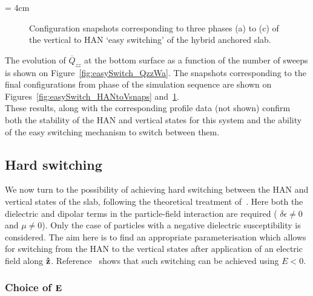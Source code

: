 \picW = 4cm
\begin{figure}
	\centering
	\caption{Configuration snapshots corresponding to three phases (a) to (c) 
	of the vertical to HAN `easy switching' of the hybrid anchored slab.}
	\label{fig:easySwitch_VtoHANsnaps}
\end{figure}

The evolution of $\overline{Q}_{zz}$ at the bottom surface as a function of the number of sweeps is
shown on Figure~\ref{fig:easySwitch_QzzWa}. The snapshots corresponding to the final
configurations from phase of the simulation sequence are shown on 
Figures~\ref{fig:easySwitch_HANtoVsnaps} and~\ref{fig:easySwitch_VtoHANsnaps}.\\
These results, along with the corresponding profile data (not shown) confirm both the stability
of the HAN and vertical states for this system and the ability of the easy switching mechanism
to switch between them.


\subsection{Hard switching}
\label{ss:hardSwitch}

We now turn to the possibility of achieving hard switching between the HAN and vertical states of 
the slab, following the theoretical treatment of~\cite{DavidsonMottram02}. Here both the
dielectric and dipolar terms in the particle-field interaction are required (\ie
$\delta\epsilon \neq 0$ and $\mu \neq 0$). Only the case of particles with a negative dielectric
susceptibility is considered. 
The aim here is to find an appropriate parameterisation which allows for switching from the HAN to
the vertical states after application of an electric field along $\mathbf{\hat{z} }$. 
Reference~\cite{DavidsonMottram02} shows that such switching can be achieved using 
$E < 0$.

\subsubsection{Choice of $\mathbf{E}$}

